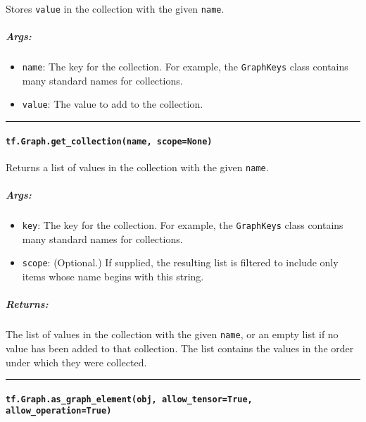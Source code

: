 Stores \lstinline{value} in the collection with the given \lstinline{name}.

\subparagraph{Args: }\label{args-4}

\begin{itemize}
\tightlist
\item
  \lstinline{name}: The key for the collection. For example, the
  \lstinline{GraphKeys} class contains many standard names for collections.
\item
  \lstinline{value}: The value to add to the collection.
\end{itemize}

\begin{center}\rule{0.5\linewidth}{\linethickness}\end{center}

\paragraph{\texorpdfstring{\lstinline{tf.Graph.get_collection(name, scope=None)}
}{tf.Graph.get_collection(name, scope=None) }}\label{tf.graph.getux5fcollectionname-scopenone}

Returns a list of values in the collection with the given \lstinline{name}.

\subparagraph{Args: }\label{args-5}

\begin{itemize}
\tightlist
\item
  \lstinline{key}: The key for the collection. For example, the
  \lstinline{GraphKeys} class contains many standard names for collections.
\item
  \lstinline{scope}: (Optional.) If supplied, the resulting list is
  filtered to include only items whose name begins with this string.
\end{itemize}

\subparagraph{Returns: }\label{returns-5}

The list of values in the collection with the given \lstinline{name}, or an
empty list if no value has been added to that collection. The list
contains the values in the order under which they were collected.

\begin{center}\rule{0.5\linewidth}{\linethickness}\end{center}

\paragraph{\texorpdfstring{\lstinline{tf.Graph.as_graph_element(obj, allow_tensor=True, allow_operation=True)}
}{tf.Graph.as_graph_element(obj, allow_tensor=True, allow_operation=True) }}\label{tf.graph.asux5fgraphux5felementobj-allowux5ftensortrue-allowux5foperationtrue}

